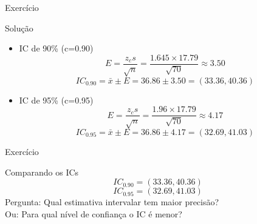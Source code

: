 \documentclass{beamer}
\begin{document}
\begin{frame}{Exercício}
  \begin{block}{Solução}
    \begin{itemize}
    \item IC de 90\% (c=0.90)
    \begin{displaymath}
      E = \frac{z_c s}{\sqrt{n}} = \frac{1.645 \times 17.79}{\sqrt{70}}
      \approx 3.50
    \end{displaymath}
    \begin{displaymath}
      IC_{0.90} = \bar{x} \pm E = 36.86 \pm 3.50 = (33.36 , 40.36)
    \end{displaymath}
  \item IC de 95\% (c=0.95)
    \begin{displaymath}
      E = \frac{z_c s}{\sqrt{n}} = \frac{1.96 \times 17.79}{\sqrt{70}}
      \approx 4.17
    \end{displaymath}
    \begin{displaymath}
      IC_{0.95} = \bar{x} \pm E = 36.86 \pm 4.17 = (32.69 , 41.03)
    \end{displaymath}
  \end{itemize}
\end{block}
\end{frame}

\begin{frame}{Exercício}
  \begin{block}{Comparando os ICs}
    \begin{displaymath}
      IC_{0.90} = (33.36 , 40.36)
    \end{displaymath}
    \begin{displaymath}
      IC_{0.95} = (32.69 , 41.03)
    \end{displaymath}
    Pergunta: Qual estimativa intervalar tem \alert{maior precisão}?\\

    Ou: Para qual nível de confiança o IC é \alert{menor}?
  \end{block}
\end{frame}
\end{document}
